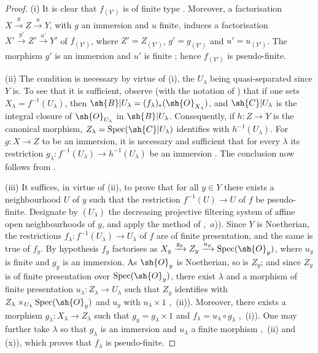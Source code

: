 \begin{proof}
(i) It is clear that $f_{(Y')}$ is of finite type . Moreover, a factorisation $X\xrightarrow{g}Z\xrightarrow{u}Y$, with $g$ an immersion and $u$ finite, induces a factorisation $X'\xrightarrow{g'}Z'\xrightarrow{u'}Y'$ of $f_{(Y')}$, where $Z'=Z_{(Y')}$, $g'=g_{(Y')}$ and $u'=u_{(Y')}$. The morphism $g'$ is an immersion  and $u'$ is finite ; hence $f_{(Y')}$ is pseudo-finite.

(ii) The condition is necessary by virtue of (i), the $U_\lambda$ being quasi-separated since $Y$ is.
To see that it is sufficient, observe (with the notation of ) that if one sets $X_\lambda=f^{-1}(U_\lambda)$, then $\sh{B}|U_\lambda=(f_\lambda)_*(\sh{O}_{X_\lambda})$, and $\sh{C}|U_\lambda$ is the integral closure of $\sh{O}_{U_\lambda}$ in $\sh{B}|U_\lambda$. Consequently, if $h:Z\to Y$ is the canonical morphism, $Z_\lambda=\operatorname{Spec}(\sh{C}|U_\lambda)$ identifies with $h^{-1}(U_\lambda)$. For $g:X\to Z$ to be an immersion, it is necessary and sufficient that for every $\lambda$ its restriction $g_\lambda:f^{-1}(U_\lambda)\to h^{-1}(U_\lambda)$ be an immersion . The conclusion now follows from .

(iii) It suffices, in virtue of (ii), to prove that for all $y\in Y$ there exists a neighbourhood $U$ of $y$ such that the restriction $f^{-1}(U)\to U$ of $f$ be pseudo-finite.
Designate by $(U_\lambda)$ the decreasing projective filtering system of affine open neighbourhoods of $y$, and apply the method of ,~$a$)).
Since $Y$ is Noetherian, the restrictions $f_\lambda:f^{-1}(U_\lambda)\to U_\lambda$ of $f$ are of finite presentation, and the same is true of $f_y$.
By hypothesis $f_y$ factorises as $X_y\xrightarrow{g_y}Z_y\xrightarrow{u_y}\operatorname{Spec}(\sh{O}_y)$, where $u_y$ is finite and $g_y$ is an immersion.
As $\sh{O}_y$ is Noetherian, so is $Z_y$; and since $Z_y$ is of finite presentation over $\operatorname{Spec}(\sh{O}_y)$, there exist $\lambda$ and a morphism of finite presentation $u_\lambda:Z_\lambda\to U_\lambda$ such that $Z_y$ identifies with $Z_\lambda\times_{U_\lambda}\operatorname{Spec}(\sh{O}_y)$ and $u_y$ with $u_\lambda\times 1$ ,~(ii)). Moreover, there exists a morphism $g_\lambda:X_\lambda\to Z_\lambda$ such that $g_y=g_\lambda\times 1$ and $f_\lambda=u_\lambda\circ g_\lambda$ ,~(i)). One may further take $\lambda$ so that $g_\lambda$ is an immersion and $u_\lambda$ a finite morphism ,~(ii) and (x)), which proves that $f_\lambda$ is pseudo-finite.
\end{proof}

